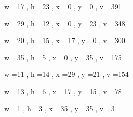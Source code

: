 \documentclass[11pt]{article}
\begin{document}
w =17 , h =23 , x =0 , y =0 , v =391
\par
w =29 , h =12 , x =0 , y =23 , v =348
\par
w =20 , h =15 , x =17 , y =0 , v =300
\par
w =35 , h =5 , x =0 , y =35 , v =175
\par
w =11 , h =14 , x =29 , y =21 , v =154
\par
w =13 , h =6 , x =17 , y =15 , v =78
\par
w =1 , h =3 , x =35 , y =35 , v =3
\par
\newpage
\end{document}
